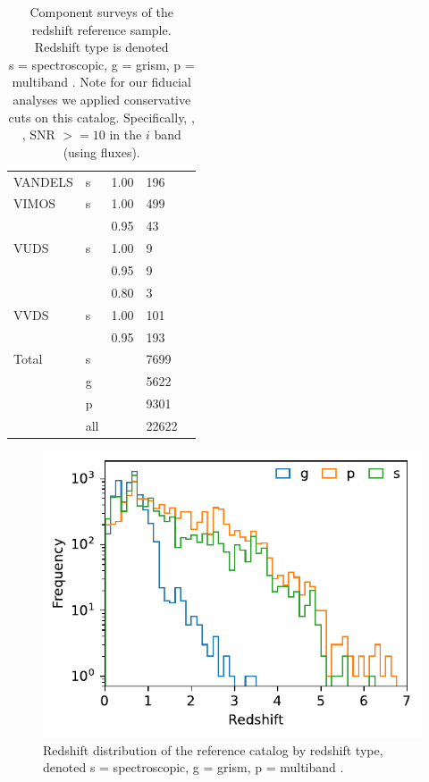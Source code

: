\begin{table}[!p]
\begin{tabular}{lllll}
        VANDELS & s & 1.00 & 196 & \citet{garilli2021} \\
        VIMOS & s & 1.00 & 499 & \citet{balestra2010} \\
                  &   & 0.95 & 43 & \\
        VUDS & s & 1.00 & 9 & \citet{tasca2017} \\
             &   & 0.95 & 9 & \\
             &   & 0.80 & 3 & \\
        VVDS & s & 1.00 & 101 & \citet{lefevre2013} \\
             &   & 0.95 & 193 & \\
        \hline
        Total & s & & 7699 & \\
              & g & & 5622 & \\
              & p & & 9301 & \\
              & all & & 22622 & \\
        \hline
    \end{tabular}
    \caption{
        Component surveys of the redshift reference sample.
        Redshift type is denoted\\ s = spectroscopic, g = grism, p = multiband \photoz.
        Note for our fiducial analyses we applied conservative cuts on this catalog.
        Specifically, , , SNR $>= 10$ in the $i$ band (using  fluxes).
    }
    \label{tab:reference-sample}
\end{table}

\begin{figure}
    \centering
    \includegraphics{figures/redshift_distribution_by_type.pdf}
    \caption{
        Redshift distribution of the reference catalog by redshift type, denoted s = spectroscopic, g = grism, p = multiband \photoz.
    }
    \label{fig:redshift-by-type}
\end{figure}

